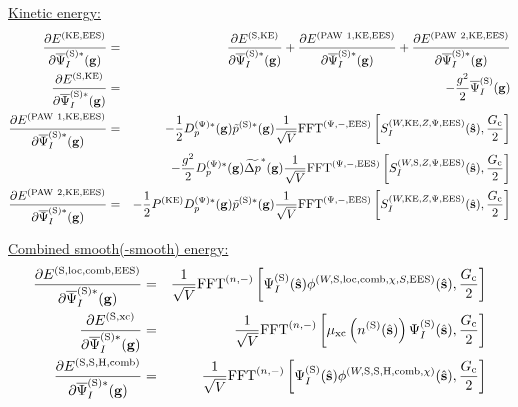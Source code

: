 \documentclass[paper=a4, fontsize=11pt]{article} %
\numberwithin{equation}{section} %
\numberwithin{figure}{section} %
\numberwithin{table}{section} %
\newcommand{\p}{\partial}
\newcommand{\wt}{\widetilde}
\newcommand{\bs}{{\bf{s}}}
\newcommand{\bg}{{\bf{g}}}
\newcommand{\hs}{{\hat{\bf{s}}}}
\newcommand{\rS}{{\mathrm{S}}}
\newcommand{\rKE}{{\mathrm{KE}}}
\newcommand{\rEES}{{\mathrm{EES}}}
\newcommand{\rxc}{{\mathrm{xc}}}
\newcommand{\rP}{{\mathrm{PAW}}}
\newcommand{\rH}{{\mathrm{H}}}
\newcommand{\rcomb}{{\mathrm{comb}}}
\newcommand{\rlo}{{\mathrm{loc}}}
\newcommand{\psigs}{{\overline \Psi_I^{(\rS)}(\bg)}}
\newcommand{\psigsc}{{\overline \Psi_I^{(\rS)*}(\bg)}}
\newcommand{\Gc}{{G_{\mathrm{c}}}}
\newcommand{\hGc}{{\frac{G_{\mathrm{c}}}{2}}}
\newcommand{\Dpgc}{{D^{(\Psi)*}_p(\bg)}}
\newcommand{\FFTni}{{\mathrm{FFT}^{(n,-)}}}
\newcommand{\FFTpiEES}{{\mathrm{FFT}^{(\Psi,-,\rEES)}}}
\begin{document}
\underline{Kinetic energy:}
\begin{eqnarray}
\label{cl:dKEdp}
\frac{\p E^{(\rKE,\rEES)}}{\p \psigsc} &=& \frac{\p E^{(\rS,\rKE)}}{\p \psigsc} + \frac{\p E^{(\rP\ 1,\rKE,\rEES)}}{\p \psigsc} + \frac{\p E^{(\rP\ 2,\rKE,\rEES)}}{\p \psigsc} \\
\frac{\p E^{(\rS,\rKE)}}{\p \psigsc}
& =& -\frac{g^2}{2}\psigs \\
\label{cl:dKESPAWdp}
\frac{\p E^{(\rP\ 1,\rKE,\rEES)}}{\p \psigsc}
&=& -\frac{1}{2} \Dpgc \tilde p^{(\rS)*}(\bg) \frac{1}{\sqrt{V}} \FFTpiEES \left[ S_I^{(W,\rKE,Z,\Psi,\rEES)}(\hs),\frac{\Gc}{2} \right] \\
&&\ \ \ \  -\frac{g^2}{2}\Dpgc \wt {\Delta p}^*(\bg)\frac{1}{\sqrt{V}} \FFTpiEES \left[ S_I^{(W,\rS,Z,\Psi,\rEES)}(\hs),\frac{\Gc}{2} \right] \\
\label{cl:dKEPAWPAWdp}
\frac{\p E^{(\rP\ 2,\rKE,\rEES)}}{\p \psigsc}
&=& -\frac{1}{2} P^{(\rKE)} \Dpgc \tilde p^{(\rS)*}(\bg) \frac{1}{\sqrt{V}} \FFTpiEES \left[ S_I^{(W,\rKE,Z,\Psi,\rEES)}(\hs),\frac{\Gc}{2} \right]
\end{eqnarray}







\underline{Combined smooth(-smooth) energy:}
\begin{eqnarray}
\label{cl:dElocsdp}
\frac{\p E^{(\rS,\rlo,\rcomb,\rEES)}}{ \p \psigsc}
&=& \frac{1}{\sqrt V} \FFTni \left[\Psi_{I}^{(\rS)}(\hat \bs) \phi^{(W,\rS,\rlo,\rcomb,\chi,S,\rEES)}(\hs),\hGc \right]\\
\label{cl:dExcSdp}
\frac{\p E^{(\rS,\rxc)}}{\p \psigsc}
&=& \frac{1}{\sqrt V} \FFTni \left[ \mu_{\rxc}\left(n^{(\rS)}(\hat \bs)\right)\Psi_{I}^{(\rS)}(\hat \bs),\hGc \right] \\
\label{cl:dEHSSdp}
\frac{\p E^{(\rS,\rS,\rH,\rcomb)}}{\p \psigsc}
&=& \frac{1}{\sqrt V} \FFTni \left[ \Psi_{I}^{(\rS)} (\hat \bs) \phi^{(W,\rS,\rS,\rH,\rcomb,\chi)}(\hs),\hGc \right]
\end{eqnarray}
\end{document}
